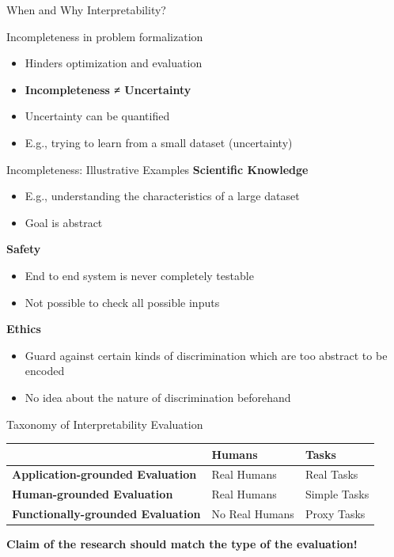 \documentclass[10pt,aspectratio=169]{beamer}
\begin{document}
\begin{frame}{When and Why Interpretability?}
\begin{block}{Incompleteness in problem formalization}
\begin{itemize}
\item Hinders optimization and evaluation
\item \textbf{Incompleteness ≠ Uncertainty}
\item Uncertainty can be quantified
\item E.g., trying to learn from a small dataset (uncertainty)
\end{itemize}
\end{block}
\end{frame}

\begin{frame}{Incompleteness: Illustrative Examples}
\textbf{Scientific Knowledge}
\begin{itemize}
\item E.g., understanding the characteristics of a large dataset
\item Goal is abstract
\end{itemize}

\textbf{Safety}
\begin{itemize}
\item End to end system is never completely testable
\item Not possible to check all possible inputs
\end{itemize}

\textbf{Ethics}
\begin{itemize}
\item Guard against certain kinds of discrimination which are too abstract to be encoded
\item No idea about the nature of discrimination beforehand
\end{itemize}
\end{frame}

\begin{frame}{Taxonomy of Interpretability Evaluation}
\begin{table}
\centering
\begin{tabular}{|p{4cm}|p{3cm}|p{3cm}|}
\hline
& \textbf{Humans} & \textbf{Tasks} \\
\hline
\textbf{Application-grounded Evaluation} & Real Humans & Real Tasks \\
\hline
\textbf{Human-grounded Evaluation} & Real Humans & Simple Tasks \\
\hline
\textbf{Functionally-grounded Evaluation} & No Real Humans & Proxy Tasks \\
\hline
\end{tabular}
\end{table}

\vspace{0.5cm}
\textbf{Claim of the research should match the type of the evaluation!}
\end{frame}
\end{document}
